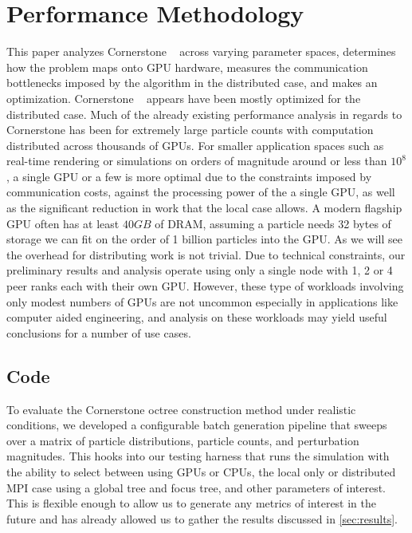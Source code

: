\section{Performance Methodology}
\label{sec:analysis}

This paper analyzes Cornerstone ~\cite{cornerstone} across varying parameter spaces, determines how the problem maps onto GPU hardware, measures the communication bottlenecks imposed by the algorithm in the distributed case, and makes an optimization. Cornerstone ~\cite{cornerstone} appears have been mostly optimized for the distributed case. Much of the already existing performance analysis in regards to Cornerstone has been for extremely large particle counts with computation distributed across thousands of GPUs. For smaller application spaces such as real-time rendering or simulations on orders of magnitude around or less than $10^8$, a single GPU or a few is more optimal due to the constraints imposed by communication costs, against the processing power of the a single GPU, as well as the significant reduction in work that the local case allows. A modern flagship GPU often has at least $40GB$ of DRAM, assuming a particle needs 32 bytes of storage we can fit on the order of 1 billion particles into the GPU. As we will see the overhead for distributing work is not trivial. Due to technical constraints, our preliminary results and analysis operate using only a single node with 1, 2 or 4 peer ranks each with their own GPU. However, these type of workloads involving only modest numbers of GPUs are not uncommon especially in applications like computer aided engineering, and analysis on these workloads may yield useful conclusions for a number of use cases.

\subsection{Code}
To evaluate the Cornerstone octree construction method under realistic conditions, we developed a configurable batch generation pipeline that sweeps over a matrix of particle distributions, particle counts, and perturbation magnitudes. This hooks into our testing harness that runs the simulation with the ability to select between using GPUs or CPUs, the local only or distributed MPI case using a global tree and focus tree, and other parameters of interest. This is flexible enough to allow us to generate any metrics of interest in the future and has already allowed us to gather the results discussed in \ref{sec:results}.

